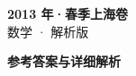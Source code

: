 \documentclass[zihao=-4, a4paper]{ctexart}
\begin{document}
\begin{center}
  {\Large\bfseries 2013 年·春季上海卷}\\[4pt]
  {\large 数学 · 解析版}
\end{center}
\medskip
{}

\clearpage
{}
\begin{center}{\Large\bfseries 参考答案与详细解析}\end{center}
\medskip

\end{document}
